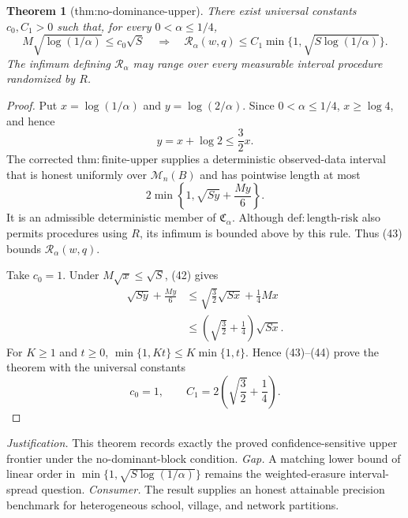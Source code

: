 \documentclass{article}
\newtheorem{theorem}{Theorem}
\begin{document}
\begin{theorem}[thm:no-dominance-upper]\label{thm:no-dominance-upper}
There exist universal constants \(c_0,C_1>0\) such that, for every
\(0<\alpha\le1/4\),
\[
 M\sqrt{\log(1/\alpha)}\le c_0\sqrt S
 \quad\Longrightarrow\quad
 \mathcal R_\alpha(w,q)
 \le C_1\min\{1,\sqrt{S\log(1/\alpha)}\}.
\]
The infimum defining \(\mathcal R_\alpha\) may range over every
measurable interval procedure randomized by \(R\).
\end{theorem}
\begin{proof}
Put \(x=\log(1/\alpha)\) and \(y=\log(2/\alpha)\). Since \(0<\alpha\le1/4\), \(x\ge\log4\), and hence
\[
 y=x+\log2\le\frac32x.
\tag{42}
\]
The corrected \(\mathrm{thm{:}finite\text{-}upper}\) supplies a deterministic observed-data interval that is honest uniformly over \(\mathcal M_n(B)\) and has pointwise length at most
\[
 2\min\left\{1,\sqrt{Sy}+\frac{My}{6}\right\}.
\tag{43}
\]
It is an admissible deterministic member of \(\mathfrak C_\alpha\). Although \(\mathrm{def{:}length\text{-}risk}\) also permits procedures using \(R\), its infimum is bounded above by this rule. Thus (43) bounds \(\mathcal R_\alpha(w,q)\).

Take \(c_0=1\). Under \(M\sqrt{x}\le\sqrt S\), (42) gives
\[
\begin{aligned}
 \sqrt{Sy}+\frac{My}{6}
 &\le\sqrt{\frac32}\sqrt{Sx}+\frac14Mx\\
 &\le\left(\sqrt{\frac32}+\frac14\right)\sqrt{Sx}.
\end{aligned}
\tag{44}
\]
For \(K\ge1\) and \(t\ge0\), \(\min\{1,Kt\}\le K\min\{1,t\}\). Hence (43)--(44) prove the theorem with the universal constants
\[
 c_0=1,
 \qquad
 C_1=2\left(\sqrt{\frac32}+\frac14\right).
\tag{45}
\]
\end{proof}
\par\smallskip\noindent \textit{Justification.} This theorem records exactly the proved confidence-sensitive upper frontier under the no-dominant-block condition. \textit{Gap.} A matching lower bound of linear order in \(\min\{1,\sqrt{S\log(1/\alpha)}\}\) remains the weighted-erasure interval-spread question. \textit{Consumer.} The result supplies an honest attainable precision benchmark for heterogeneous school, village, and network partitions.
\end{document}
